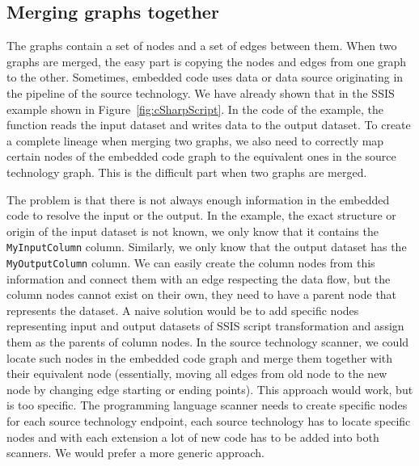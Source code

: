 \subsection{Merging graphs together}
\label{sec:pin}
The graphs contain a set of nodes and a set of edges between them. When two graphs are merged, the easy part is copying the nodes and edges from one graph to the other. Sometimes, embedded code uses data or data source originating in the pipeline of the source technology. We have already shown that in the SSIS example shown in Figure~\ref{fig:cSharpScript}. In the code of the example, the function reads the input dataset and writes data to the output dataset. To create a complete lineage when merging two graphs, we also need to correctly map certain nodes of the embedded code graph to the equivalent ones in the source technology graph. This is the difficult part when two graphs are merged.
\par
The problem is that there is not always enough information in the embedded code to resolve the input or the output. In the example, the exact structure or origin of the input dataset is not known, we only know that it contains the \texttt{MyInputColumn} column. Similarly, we only know that the output dataset has the \texttt{MyOutputColumn} column. We can easily create the column nodes from this information and connect them with an edge respecting the data flow, but the column nodes cannot exist on their own, they need to have a parent node that represents the dataset. A naive solution would be to add specific nodes representing input and output datasets of SSIS script transformation and assign them as the parents of column nodes. In the source technology scanner, we could locate such nodes in the embedded code graph and merge them together with their equivalent node (essentially, moving all edges from old node to the new node by changing edge starting or ending points). This approach would work, but is too specific. The programming language scanner needs to create specific nodes for each source technology endpoint, each source technology has to locate specific nodes and with each extension a lot of new code has to be added into both scanners. We would prefer a more generic approach.
\par
